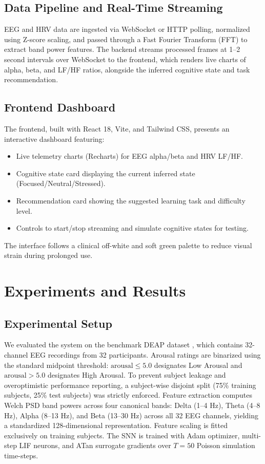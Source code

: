 \documentclass[conference]{IEEEtran}
\begin{document}
\subsection{Data Pipeline and Real-Time Streaming}
EEG and HRV data are ingested via WebSocket or HTTP polling, normalized using Z-score scaling, and passed through a Fast Fourier Transform (FFT) to extract band power features. The backend streams processed frames at 1–2 second intervals over WebSocket to the frontend, which renders live charts of alpha, beta, and LF/HF ratios, alongside the inferred cognitive state and task recommendation.

\subsection{Frontend Dashboard}
The frontend, built with React 18, Vite, and Tailwind CSS, presents an interactive dashboard featuring:
\begin{itemize}
\item Live telemetry charts (Recharts) for EEG alpha/beta and HRV LF/HF.
\item Cognitive state card displaying the current inferred state (Focused/Neutral/Stressed).
\item Recommendation card showing the suggested learning task and difficulty level.
\item Controls to start/stop streaming and simulate cognitive states for testing.
\end{itemize}
The interface follows a clinical off-white and soft green palette to reduce visual strain during prolonged use.

\section{Experiments and Results}
\label{experiments}
\subsection{Experimental Setup}
We evaluated the system on the benchmark DEAP dataset \cite{deap2012}, which contains 32-channel EEG recordings from 32 participants. Arousal ratings are binarized using the standard midpoint threshold: $\text{arousal} \le 5.0$ designates Low Arousal and $\text{arousal} > 5.0$ designates High Arousal. To prevent subject leakage and overoptimistic performance reporting, a subject-wise disjoint split (75\% training subjects, 25\% test subjects) was strictly enforced. Feature extraction computes Welch PSD band powers across four canonical bands: Delta (1--4 Hz), Theta (4--8 Hz), Alpha (8--13 Hz), and Beta (13--30 Hz) across all 32 EEG channels, yielding a standardized 128-dimensional representation. Feature scaling is fitted exclusively on training subjects. The SNN is trained with Adam optimizer, multi-step LIF neurons, and ATan surrogate gradients over $T=50$ Poisson simulation time-steps.
\end{document}
